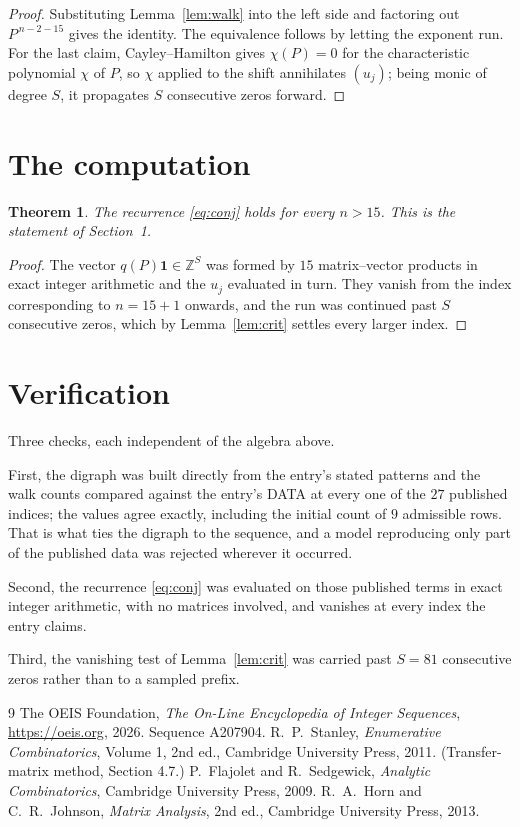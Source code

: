 \documentclass[11pt,a4paper]{article}
\theoremstyle{plain}
\newtheorem{theorem}{Theorem}
\theoremstyle{definition}
\begin{document}
\begin{proof}
Substituting Lemma~\ref{lem:walk} into the left side and factoring out
$P^{\,n-2-15}$ gives the identity. The equivalence follows by letting the exponent
run. For the last claim, Cayley--Hamilton gives $\chi(P)=0$ for the characteristic
polynomial $\chi$ of $P$, so $\chi$ applied to the shift annihilates $(u_j)$; being monic of
degree $S$, it propagates $S$ consecutive zeros forward.
\end{proof}

\section{The computation}

\begin{theorem}
The recurrence \eqref{eq:conj} holds for every $n>15$. This is the statement of
Section~1.
\end{theorem}

\begin{proof}
The vector $q(P)\mathbf{1}\in\mathbb{Z}^{S}$ was formed by $15$ matrix--vector
products in exact integer arithmetic and the $u_j$ evaluated in turn. They vanish from the
index corresponding to $n=15+1$ onwards, and the run was continued past $S$ consecutive
zeros, which by Lemma~\ref{lem:crit} settles every larger index.
\end{proof}

\section{Verification}

Three checks, each independent of the algebra above.

First, the digraph was built directly from the entry's stated patterns and the walk counts
compared against the entry's DATA at every one of the $27$ published indices; the
values agree exactly, including the initial count of $9$ admissible rows. That is
what ties the digraph to the sequence, and a model reproducing only part of the published
data was rejected wherever it occurred.

Second, the recurrence \eqref{eq:conj} was evaluated on those published terms in exact
integer arithmetic, with no matrices involved, and vanishes at every index the entry claims.

Third, the vanishing test of Lemma~\ref{lem:crit} was carried past $S=81$ consecutive
zeros rather than to a sampled prefix.

\begin{thebibliography}{9}
 The OEIS Foundation, \emph{The On-Line Encyclopedia of Integer
Sequences}, \url{https://oeis.org}, 2026. Sequence A207904.
 R.~P.~Stanley, \emph{Enumerative Combinatorics}, Volume 1, 2nd ed.,
Cambridge University Press, 2011. (Transfer-matrix method, Section 4.7.)
 P.~Flajolet and R.~Sedgewick, \emph{Analytic Combinatorics}, Cambridge
University Press, 2009.
 R.~A.~Horn and C.~R.~Johnson, \emph{Matrix Analysis}, 2nd ed., Cambridge
University Press, 2013.
\end{thebibliography}
\end{document}
